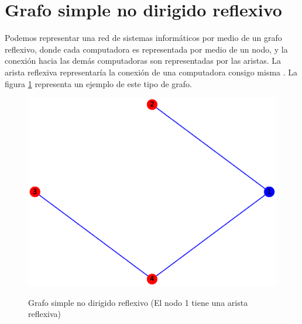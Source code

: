 \documentclass{article}
\begin{document}

\section{Grafo simple no dirigido reflexivo}
Podemos representar una red de sistemas informáticos por medio de un grafo reflexivo, donde cada computadora es representada por medio de un nodo, y la conexión hacia las demás computadoras son representadas por las aristas. La arista reflexiva representaría la conexión de una computadora consigo misma \cite{GSNDR}. La figura \ref{fig:GSNDR} representa un ejemplo de este tipo de grafo.
\begin{figure}[h!]
    \caption{Grafo simple no dirigido reflexivo (El nodo 1 tiene una arista reflexiva)}
    \includegraphics[width=\textwidth]{3-GSNDC}
    \label{fig:GSNDR}
\end{figure}



\end{document}
